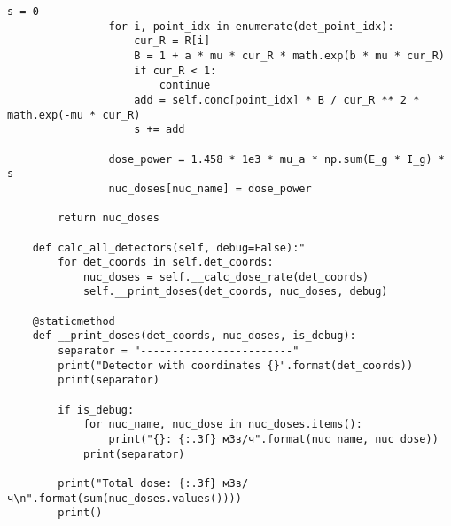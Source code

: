 \begin{lstlisting}[caption=Исходный код модуля расчета мощности эквивалентной дозы внешнего гамма-излучения, 
                    label={lst_dose_calc}, basicstyle=\scriptsize]
                s = 0
                for i, point_idx in enumerate(det_point_idx):
                    cur_R = R[i]
                    B = 1 + a * mu * cur_R * math.exp(b * mu * cur_R)
                    if cur_R < 1:
                        continue
                    add = self.conc[point_idx] * B / cur_R ** 2 * math.exp(-mu * cur_R)
                    s += add

                dose_power = 1.458 * 1e3 * mu_a * np.sum(E_g * I_g) * s
                nuc_doses[nuc_name] = dose_power

        return nuc_doses

    def calc_all_detectors(self, debug=False):"
        for det_coords in self.det_coords:
            nuc_doses = self.__calc_dose_rate(det_coords)
            self.__print_doses(det_coords, nuc_doses, debug)

    @staticmethod
    def __print_doses(det_coords, nuc_doses, is_debug):
        separator = "------------------------"
        print("Detector with coordinates {}".format(det_coords))
        print(separator)

        if is_debug:
            for nuc_name, nuc_dose in nuc_doses.items():
                print("{}: {:.3f} мЗв/ч".format(nuc_name, nuc_dose))
            print(separator)

        print("Total dose: {:.3f} мЗв/ч\n".format(sum(nuc_doses.values())))
        print()
\end{lstlisting}


\clearpage